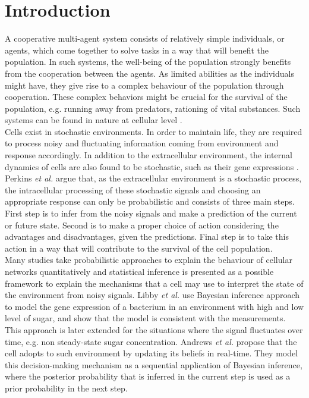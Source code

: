 \chapter{Introduction}
A cooperative multi-agent system consists of relatively simple individuals, or agents, which come together to solve tasks in a way that will benefit the population. In such systems, the well-being of the population strongly benefits from the cooperation between the agents. As limited abilities as the individuals might have, they give rise to a complex behaviour of the population through cooperation. These complex behaviors might be crucial for the survival of the population, e.g. running away from predators, rationing of vital substances. Such systems can be found in nature at cellular level \cite{Perkins2009a}. \\
Cells exist in stochastic environments. In order to maintain life, they are required to process noisy and fluctuating information coming from environment and response accordingly. In addition to the extracellular environment, the internal dynamics of cells are also found to be stochastic, such as their gene expressions \cite{Shahrezaei2008}. \\
Perkins \textit{et al.} \cite{Perkins2009a} argue that, as the extracellular environment is a stochastic process, the intracellular processing of these stochastic signals and choosing an appropriate response can only be probabilistic and consists of three main steps. First step is to infer from the noisy signals and make a prediction of the current or future state. Second is to make a proper choice of action considering the advantages and disadvantages, given the predictions. Final step is to take this action in a way that will contribute to the survival of the cell population. \\
Many studies take probabilistic approaches to explain the behaviour of cellular networks quantitatively and statistical inference is presented as a possible framework to explain the mechanisms that a cell may use to interpret the state of the environment from noisy signals. Libby \textit{et al.} \cite{Libby2007} use Bayesian inference approach to model the gene expression of a bacterium in an environment with high and low level of sugar, and show that the model is consistent with the measurements. This approach is later extended for the situations where the signal fluctuates over time, e.g. non steady-state sugar concentration. Andrews \textit{et al.} \cite{Andrews2006} propose that the cell adopts to such environment by updating its beliefs in real-time. They model this decision-making mechanism as a sequential application of Bayesian inference, where the posterior probability that is inferred in the current step is used as a prior probability in the next step.\\
